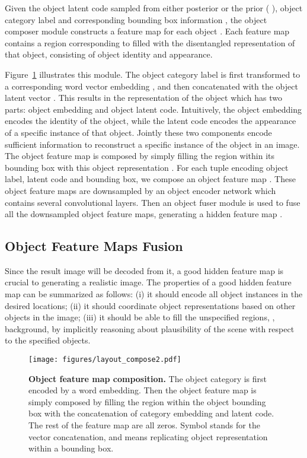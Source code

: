 \documentclass[10pt,twocolumn,letterpaper]{article}
\begin{document}
Given the object latent code  sampled from either posterior or the prior ( ), object category label  and corresponding bounding box information , the object composer module constructs a feature map  for each object . Each feature map  contains a region corresponding to  filled with the disentangled representation of that object, consisting of object identity and appearance.

Figure~\ref{fig:layout_composition} illustrates this module.
The object category label  is first transformed to a corresponding word vector embedding , and then concatenated with the object latent vector . 
This results in the representation of the object which has two parts: object embedding and object latent code. Intuitively, the object embedding encodes the identity of the object, while the latent code encodes the appearance of a specific instance of that object. Jointly these two components encode sufficient information to reconstruct a specific instance of the object in an image. 
The object feature map  is composed by simply filling the region within its bounding box with this object representation .
For each  tuple  encoding object label, latent code and bounding box, we compose an object feature map . 
These object feature maps are downsampled by an object encoder network which contains several convolutional layers. 
Then an object fuser module is used to fuse all the downsampled object feature maps, generating a hidden feature map .




\subsection{Object Feature Maps Fusion}
Since the result image will be decoded from it, a good hidden feature map  is crucial to generating a realistic image. 
The properties of a good hidden feature map can be summarized as follows:
(i) it should encode all object instances in the desired locations; 
(ii) it should coordinate object representations based on other objects in the image;
(iii) it should be able to fill the unspecified regions, \eg, background, by implicitly reasoning about plausibility of the scene with respect to the specified objects. 

\begin{figure}[!t]
    \begin{center}
\texttt{[image: figures/layout\_compose2.pdf]}
    \end{center}
    \caption{{\bf Object feature map composition.} The object category is first encoded by a word embedding. Then the object feature map is simply composed by filling the region within the object bounding box with the concatenation of category embedding and latent code. The rest of the feature map are all zeros. Symbol  stands for the vector concatenation, and  means replicating object representation within a bounding box.}
    \label{fig:layout_composition}
    \vspace{-0.1in}
\end{figure}
\end{document}

